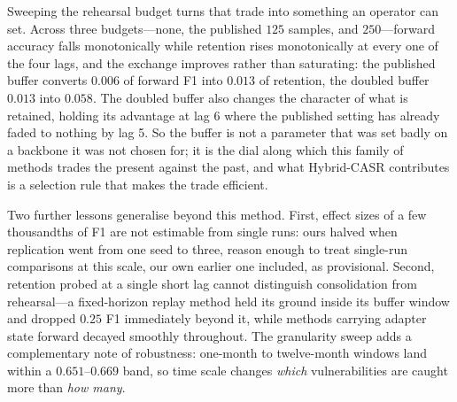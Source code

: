 \documentclass[a4paper,twoside]{article}
\begin{document}
Sweeping the rehearsal budget turns that trade into something an operator can set. Across three budgets---none, the published $125$ samples, and $250$---forward accuracy falls monotonically while retention rises monotonically at every one of the four lags, and the exchange improves rather than saturating: the published buffer converts $0.006$ of forward F1 into $0.013$ of retention, the doubled buffer $0.013$ into $0.058$. The doubled buffer also changes the character of what is retained, holding its advantage at lag 6 where the published setting has already faded to nothing by lag 5. So the buffer is not a parameter that was set badly on a backbone it was not chosen for; it is the dial along which this family of methods trades the present against the past, and what Hybrid-CASR contributes is a selection rule that makes the trade efficient.

Two further lessons generalise beyond this method. First, effect sizes of a few thousandths of F1 are not estimable from single runs: ours halved when replication went from one seed to three, reason enough to treat single-run comparisons at this scale, our own earlier one included, as provisional. Second, retention probed at a single short lag cannot distinguish consolidation from rehearsal---a fixed-horizon replay method held its ground inside its buffer window and dropped $0.25$ F1 immediately beyond it, while methods carrying adapter state forward decayed smoothly throughout. The granularity sweep adds a complementary note of robustness: one-month to twelve-month windows land within a $0.651$--$0.669$ band, so time scale changes \emph{which} vulnerabilities are caught more than \emph{how many}.
\end{document}
